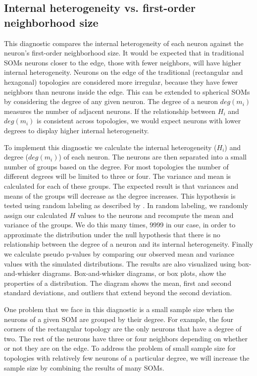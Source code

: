 \subsection{Internal heterogeneity vs. first-order neighborhood size}
\label{q1}
This diagnostic compares the internal heterogeneity of each neuron against
the neuron's first-order neighborhood size.  It would be expected that in
traditional SOMs neurons closer to the edge, those with fewer neighbors, will
have higher internal heterogeneity. Neurons on the edge of the traditional
(rectangular and hexagonal) topologies are considered more irregular, because
they have fewer neighbors than neurons inside the edge.  This can be extended to
spherical SOMs by considering the degree of any given neuron.  The degree of a
neuron $deg(m_i)$ measures the number of adjacent neurons.  If the
relationship between $H_i$ and $deg(m_i)$ is consistent across topologies,
we would expect neurons with lower degrees to display higher internal heterogeneity.

To implement this diagnostic we calculate the internal heterogeneity ($H_i$)
and degree ($deg(m_i)$) of each neuron. The neurons are then separated into a small number of
groups based on the degree.  For most topologies the number of
different degrees will be limited to three or four.  The variance and mean
is calculated for each of these groups.  The expected result is that
variances and means of the groups will decrease as the degree increases.  This
hypothesis is tested using random labeling as described by \cite{siss2004}.
In random labeling, we randomly assign our calculated $H$ values to the
neurons and recompute the mean and variance of the groups.  We do this many times,
9999 in our case, in order to approximate the distribution under the null
hypothesis that there is no relationship between the degree of a neuron and
its internal heterogeneity. Finally we
calculate pseudo p-values by comparing our observed mean and variance values
with the simulated distributions.  The results are also visualized using
box-and-whisker diagrams. Box-and-whisker diagrams, or box plots, show the
properties of a distribution.  The diagram shows the mean, first and second
standard deviations, and outliers that extend beyond the second deviation.

One problem that we face in this diagnostic is a small sample size when the neurons of a given
SOM are grouped by their degree.  For example, the four corners of the
rectangular topology are the only neurons that have a degree of two.  The rest
of the neurons have three or four neighbors depending on whether or not they
are on the edge. To address the problem of small sample size for topologies
with relatively few neurons of a particular degree, we will increase
the sample size by combining the results of many SOMs.

